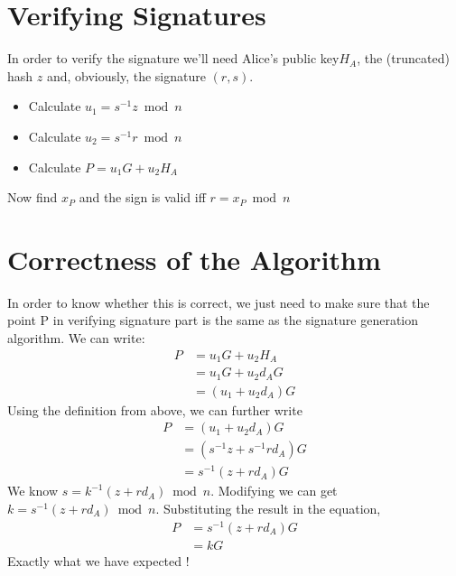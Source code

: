 \documentclass{article}
\begin{document}
\section{Verifying Signatures}
In order to verify the signature we'll need Alice's public key$H_A$, the (truncated) hash $z$ and, obviously, the signature $(r,s)$.
\begin{itemize}
    \item Calculate $u_1 = s^{-1} z \bmod{n}$
    \item Calculate $u_2 = s^{-1} r \bmod{n}$
    \item Calculate $P = u_1 G + u_2 H_A$
\end{itemize}
Now find $x_P$ and the sign is valid iff $r = x_P \bmod{n}$
\section{Correctness of the Algorithm}
In order to know whether this is correct, we just need to make sure that the point P in verifying signature part is the same as the signature generation algorithm.
We can write:\\
\begin{align*}
  P & = u_1 G + u_2 H_A \\
    & = u_1 G + u_2 d_A G \\
    & = (u_1 + u_2 d_A) G
\end{align*}
Using the definition from above, we can further write
\begin{align*}
  P & = (u_1 + u_2 d_A) G \\
    & = (s^{-1} z + s^{-1} r d_A) G \\
    & = s^{-1} (z + r d_A) G
\end{align*}
We know $s = k^{-1} (z + rd_A) \bmod{n}$. Modifying we can get $k = s^{-1} (z + rd_A) \bmod{n}$. Substituting the result in the equation, \begin{align*}
  P & = s^{-1} (z + r d_A) G \\
    & = k G
\end{align*}
Exactly what we have expected !
\end{document}

